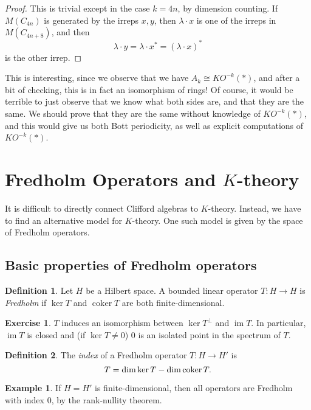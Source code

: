 \documentclass{shortart}
\theoremstyle{definition}
\newtheorem*{defi}{Definition}
\newtheorem*{eg}{Example}
\newtheorem*{ex}{Exercise}
\let\index\relax
\DeclareMathOperator{\index}{idx}
\DeclareMathOperator{\coker}{coker}
\DeclareMathOperator{\im}{im}
\begin{document}
\begin{proof}
  This is trivial except in the case $k = 4n$, by dimension counting. If $M(C_{4n})$ is generated by the irreps $x, y$, then $\lambda \cdot x$ is one of the irreps in $M(C_{4n + 8})$, and then
  \[
    \lambda \cdot y = \lambda \cdot x^* = (\lambda \cdot x)^*
  \]
  is the other irrep.
\end{proof}
This is interesting, since we observe that we have $A_k \cong KO^{-k}(*)$, and after a bit of checking, this is in fact an isomorphism of rings! Of course, it would be terrible to just observe that we know what both sides are, and that they are the same. We should prove that they are the same without knowledge of $KO^{-k}(*)$, and this would give us both Bott periodicity, as well as explicit computations of $KO^{-k}(*)$.

\section{Fredholm Operators and \texorpdfstring{$K$}{K}-theory}
It is difficult to directly connect Clifford algebras to $K$-theory. Instead, we have to find an alternative model for $K$-theory. One such model is given by the space of Fredholm operators.

\subsection{Basic properties of Fredholm operators}
\begin{defi}
  Let $H$ be a Hilbert space. A bounded linear operator $T: H \to H$ is \emph{Fredholm} if $\ker T$ and $\coker T$ are both finite-dimensional.
\end{defi}
\begin{ex}
  $T$ induces an isomorphism between $\ker T^\perp$ and $\im T$. In particular, $\im T$ is closed and (if $\ker T \not= 0$) $0$ is an isolated point in the spectrum of $T$.
\end{ex}

\begin{defi}
  The \emph{index} of a Fredholm operator $T: H \to H'$ is
  \[
    \index T = \dim \ker T - \dim \coker T.
  \]
\end{defi}

\begin{eg}
  If $H = H'$ is finite-dimensional, then all operators are Fredholm with index $0$, by the rank-nullity theorem.
\end{eg}
\end{document}
